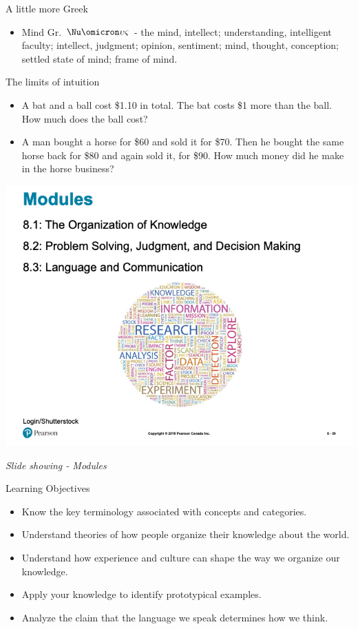 \documentclass[
]{book}
\providecommand{\tightlist}{%
  \setlength{\itemsep}{0pt}\setlength{\parskip}{0pt}}
\begin{document}
\begin{reflect}
A little more Greek

\begin{itemize}
\tightlist
\item
  Mind Gr. \(\Nu\omicron\upsilon\varsigma\) - the mind, intellect; understanding, intelligent faculty; intellect, judgment; opinion, sentiment; mind, thought, conception; settled state of mind; frame of mind.
\end{itemize}

The limits of intuition

\begin{itemize}
\tightlist
\item
  A bat and a ball cost \$1.10 in total. The bat costs \$1 more than the ball. How much does the ball cost?\\
\item
  A man bought a horse for \$60 and sold it for \$70. Then he bought the same horse back for \$80 and again sold it, for \$90. How much money did he make in the horse business?
\end{itemize}

\includegraphics{assets/unit_1/slide_39.png}

\emph{Slide showing - Modules}

Learning Objectives

\begin{itemize}
\tightlist
\item
  Know the key terminology associated with concepts and categories.\\
\item
  Understand theories of how people organize their knowledge about the world.\\
\item
  Understand how experience and culture can shape the way we organize our knowledge.\\
\item
  Apply your knowledge to identify prototypical examples.\\
\item
  Analyze the claim that the language we speak determines how we think.
\end{itemize}


\end{reflect}
\end{document}

